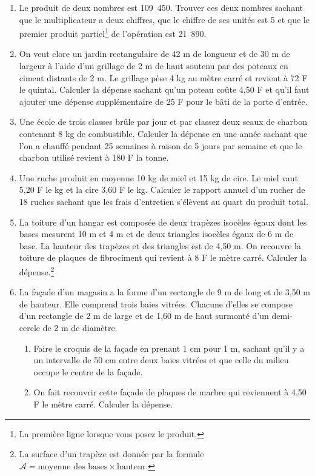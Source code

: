 \begin{enumerate}
 \item Le produit de deux nombres est 109~450. Trouver ces deux nombres sachant que le multiplicateur a deux chiffres, que le chiffre de ses unités est 5 et que le premier produit partiel\footnote{La première ligne lorsque vous posez le produit.} de l'opération est 21~890. 
 \item On veut clore un jardin rectangulaire de 42 m de longueur et de 30 m de largeur à l'aide d'un grillage de 2 m de haut soutenu par des poteaux en 
 ciment distants de 2 m. Le grillage pèse 4 kg au mètre carré et revient à 72 F le quintal. Calculer la dépense sachant qu'un poteau coûte 4,50 F et qu'il faut ajouter une dépense supplémentaire de 25 F pour 
 le bâti de la porte d'entrée.
 \item Une école de trois classes brûle par jour et par classez deux seaux de charbon contenant 8 kg de 
 combustible. Calculer la dépense en une année sachant
 que l'on a chauffé pendant 25 semaines à raison de 
 5 jours par semaine et que le charbon utilisé revient à 180 F la tonne. 
 \item Une ruche produit en moyenne 10 kg de miel et 15 kg de cire. Le miel vaut 5,20 F le kg et la cire 3,60 F le kg. Calculer le rapport annuel d'un rucher 
 de 18 ruches sachant que les frais d'entretien s'élèvent au quart du produit total. 
 \item La toiture d'un hangar est composée de deux 
 trapèzes isocèles égaux dont les bases mesurent 
 10 m et 4 m et de deux triangles isocèles égaux de 6 m de base. La hauteur des trapèzes et des triangles est de 4,50 m. On recouvre la toiture de plaques de 
 fibrociment qui revient à 8 F le mètre carré. Calculer la dépense.\footnote{La surface d'un trapèze est donnée par la formule $\mathcal A = \text{moyenne des bases}\times \text{hauteur}$.}
 \item La façade d'un magasin a la forme d'un rectangle de 9 m de long et de 3,50 m de hauteur. Elle
 comprend trois baies vitrées. Chacune d'elles se compose d'un rectangle de 2 m de large et de 1,60 m de haut surmonté d'un demi-cercle de 2 m de diamètre. 
 \begin{enumerate}
 \item Faire le croquis de la façade en prenant 1 cm 
 pour 1 m, sachant qu'il y a un intervalle de 50 cm
 entre deux baies vitrées et que celle du milieu occupe le centre de la façade. 
 \item On fait recouvrir cette façade de plaques de marbre qui reviennent à 4,50 F le mètre carré. Calculer la dépense. 
 \end{enumerate}

\end{enumerate}
